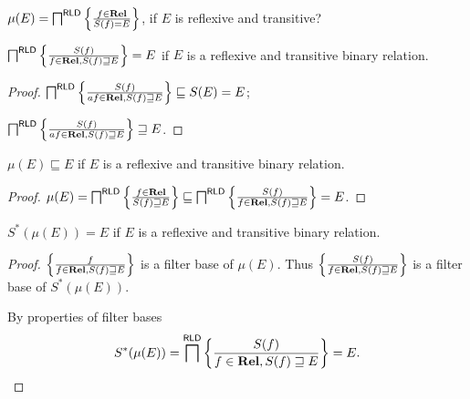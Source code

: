 \begin{question}
$\mu(E) = \bigsqcap^{\mathsf{RLD}} \left\{ \frac{f\in\mathbf{Rel}}{S(f)=E}\right\}$, if $E$ is reflexive and transitive?
\end{question}

\begin{lem}
  $\bigsqcap^{\mathsf{RLD}} \left\{ \frac{ S (f) }{f
  \in \mathbf{Rel}, S (f) \sqsupseteq E }\right\} = E$ if $E$ is a
  reflexive and transitive binary relation.
\end{lem}

\begin{proof}
  $\bigsqcap^{\mathsf{RLD}} \left\{ \frac{ S (f) }{a f
  \in \mathbf{Rel}, S (f) \sqsupseteq E }\right\} \sqsubseteq S (E) =
  E$;
  
  $\bigsqcap^{\mathsf{RLD}} \left\{ \frac{ S (f) }{a f
  \in \mathbf{Rel}, S (f) \sqsupseteq E }\right\} \sqsupseteq E$.
\end{proof}

\begin{prop}
  $\mu (E) \sqsubseteq E$ if $E$ is a reflexive and transitive binary
  relation.
\end{prop}

\begin{proof}
  $\mu (E) = \bigsqcap^{\mathsf{RLD}} \left\{ \frac{ f \in
  \mathbf{Rel} }{ S (f) \sqsupseteq E
  }\right\} \sqsubseteq \bigsqcap^{\mathsf{RLD}} \left\{ \frac{ S (f)
  }{ f \in \mathbf{Rel}, S (f) \sqsupseteq E
  }\right\} = E$.
\end{proof}

\begin{thm}
  $S^{\ast} (\mu (E)) = E$ if $E$ is a reflexive and transitive binary
  relation.
\end{thm}

\begin{proof}
  $\left\{ \frac{ f }{ f \in \mathbf{Rel}, S (f)
  \sqsupseteq E }\right\}$ is a filter base of $\mu (E)$. Thus $\left\{ \frac{ S
  (f) }{ f \in \mathbf{Rel}, S (f)
  \sqsupseteq E }\right\}$ is a filter base of $S^{\ast} (\mu (E))$.
  
  By properties of filter bases
  \[ S^{\ast} (\mu (E)) = \bigsqcap^{\mathsf{RLD}} \left\{ \frac{ S (f)
     }{ f \in \mathbf{Rel}, S (f)
     \sqsupseteq E }\right\} = E. \]
\end{proof}